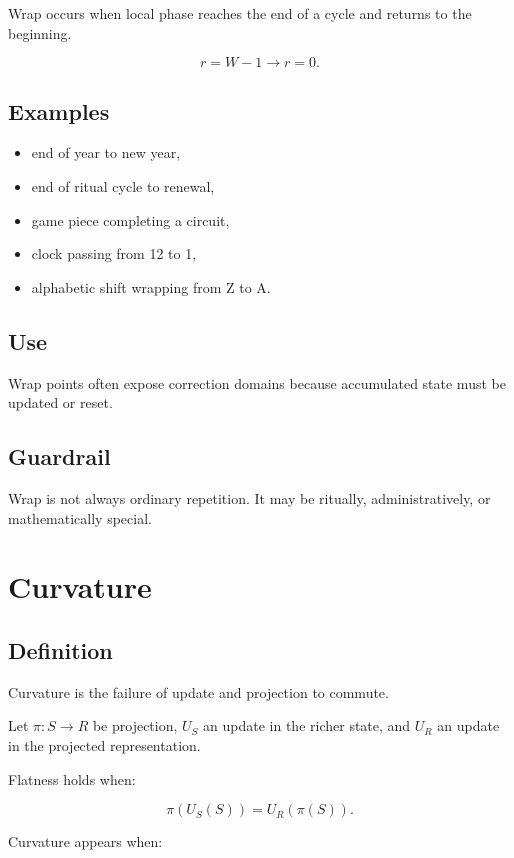 \documentclass[11pt]{book}
\begin{document}
Wrap occurs when local phase reaches the end of a cycle and returns to the beginning.

\[
r=W-1 \rightarrow r=0.
\]

\subsection*{Examples}

\begin{itemize}
    \item end of year to new year,
    \item end of ritual cycle to renewal,
    \item game piece completing a circuit,
    \item clock passing from 12 to 1,
    \item alphabetic shift wrapping from Z to A.
\end{itemize}

\subsection*{Use}

Wrap points often expose correction domains because accumulated state must be updated or reset.

\subsection*{Guardrail}

Wrap is not always ordinary repetition. It may be ritually, administratively, or mathematically special.

\section{Curvature}

\subsection*{Definition}

Curvature is the failure of update and projection to commute.

Let \(\pi:S \to R\) be projection, \(U_S\) an update in the richer state, and \(U_R\) an update in the projected representation.

Flatness holds when:

\[
\pi(U_S(S)) = U_R(\pi(S)).
\]

Curvature appears when:
\end{document}
